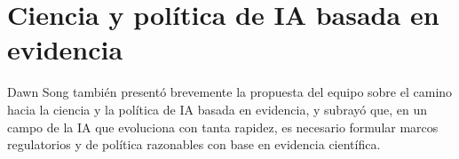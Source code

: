 \section{Ciencia y política de IA basada en evidencia}

Dawn Song también presentó brevemente la propuesta del equipo sobre el camino hacia la ciencia y la política de IA basada en evidencia, y subrayó que, en un campo de la IA que evoluciona con tanta rapidez, es necesario formular marcos regulatorios y de política razonables con base en evidencia científica.

